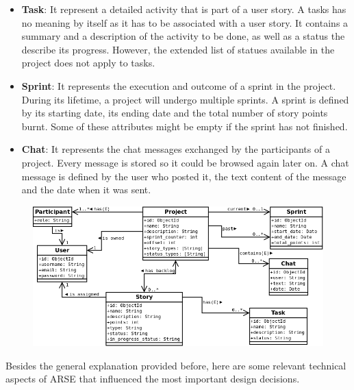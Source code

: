 \documentclass[
	accentcolor=tud1a %
]{tudreport}
\begin{document}
\begin{itemize}
\item \textbf{Task}: It represent a detailed activity that is part of a user story. A tasks has no meaning by itself as it has to be associated with a user story. It contains a summary and a description of the activity to be done, as well as a status the describe its progress. However, the extended list of statues available in the project does not apply to tasks.

\item \textbf{Sprint}: It represents the execution and outcome of a sprint in the project. During its lifetime, a project will undergo multiple sprints. A sprint is defined by its starting date, its ending date and the total number of story points burnt. Some of these attributes might be empty if the sprint has not finished.

\item \textbf{Chat}: It represents the chat messages exchanged by the participants of a project. Every message is stored so it could be browsed again later on. A chat message is defined by the user who posted it, the text content of the message and the date when it was sent.

\end{itemize}

\begin{figure}[ht]
  \centering
    \includegraphics[height=20EM]{img/class-diagram}
    \label{fig:class-diagram}
\end{figure}

Besides the general explanation provided before, here are some relevant technical aspects of ARSE that influenced the most important design decisions.
\end{document}
